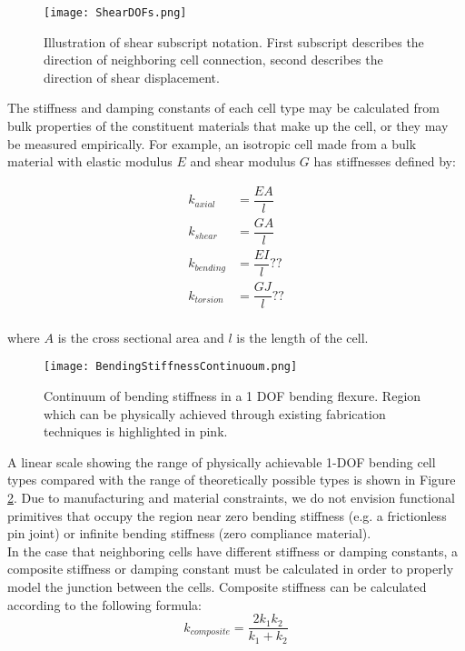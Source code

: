 {\begin{figure}
  \texttt{[image: ShearDOFs.png]}
  \caption{Illustration of shear subscript notation.  First subscript describes the direction of neighboring cell connection, second describes the direction of shear displacement.}
  \label{fig:ShearDOFs}
\end{figure}

The stiffness and damping constants of each cell type may be calculated from bulk properties of the constituent materials that make up the cell, or they may be measured empirically.  For example, an isotropic cell made from a bulk material with elastic modulus $E$ and shear modulus $G$ has stiffnesses defined by:

\begin{subequations}
\begin{align} 
\label{eq:kaxial}
k_{axial} &= \dfrac{EA}{l}\\[10pt]
\label{eq:kshear}
k_{shear} &= \dfrac{GA}{l}\\[10pt]
\label{eq:kbending}
k_{bending} &= \dfrac{EI}{l}??\\[10pt]
\label{eq:ktorsion}
k_{torsion} &= \dfrac{GJ}{l}??
\end{align}
\end{subequations}
\\
where $A$ is the cross sectional area and $l$ is the length of the cell.\\

 \begin{figure}
  \texttt{[image: BendingStiffnessContinuoum.png]}
  \caption{Continuum of bending stiffness in a 1 DOF bending flexure.  Region which can be physically achieved through existing fabrication techniques is highlighted in pink.}
  \label{fig:BendingStiffnessContinuoum}
\end{figure}

A linear scale showing the range of physically achievable 1-DOF bending cell types compared with the range of theoretically possible types is shown in Figure \ref{fig:BendingStiffnessContinuoum}.  Due to manufacturing and material constraints, we do not envision functional primitives that occupy the region near zero bending stiffness (e.g. a frictionless pin joint) or infinite bending stiffness (zero compliance material).\\

In the case that neighboring cells have different stiffness or damping constants, a composite stiffness or damping constant must be calculated in order to properly model the junction between the cells.  Composite stiffness can be calculated according to the following formula:
 \begin{equation} \label{eq:springseries}
 k_{composite} = \dfrac{2k_1k_2}{k_1+k_2}
 \end{equation}

}

